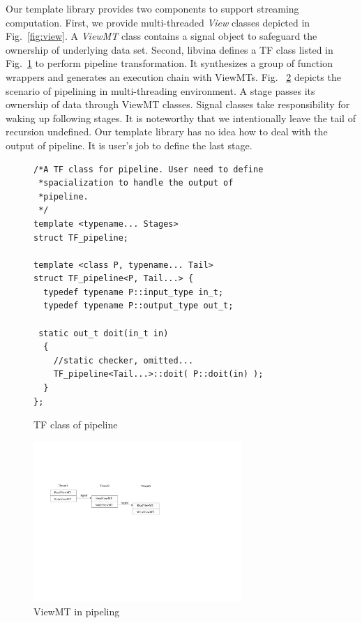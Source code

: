 \documentclass[10pt, conference, compsocconf]{IEEEtran}
\begin{document}
Our template library provides two components to support streaming
computation. First, we provide  multi-threaded \emph{View}
classes depicted in Fig.~\ref{fig:view}. A \emph{ViewMT} class
contains a signal object to safeguard the ownership of underlying data
set. Second, libvina
defines a TF class listed in Fig.~\ref{lst:pipe} to perform
pipeline transformation. It synthesizes a group of function wrappers
and generates an execution chain with ViewMTs.  Fig. ~\ref{fig:viewmt}
depicts the scenario of pipelining in multi-threading environment. A
stage passes its ownership of data through ViewMT classes. Signal
classes take responsibility for waking up following stages.  It is noteworthy
that we intentionally leave the tail of recursion undefined. Our
template library has no idea how to deal with the output of pipeline. It is user's job
to define the last stage.

\begin{figure}[!htp]
\begin{minipage}[tb]{\linewidth}
\makebox[\textwidth]{\hrulefill}
\begin{small}
\begin{verbatim}
/*A TF class for pipeline. User need to define 
 *spacialization to handle the output of 
 *pipeline.
 */
template <typename... Stages>
struct TF_pipeline;

template <class P, typename... Tail>
struct TF_pipeline<P, Tail...> {
  typedef typename P::input_type in_t;
  typedef typename P::output_type out_t;
 
 static out_t doit(in_t in)
  {
    //static checker, omitted...
    TF_pipeline<Tail...>::doit( P::doit(in) );
  }
};  
\end{verbatim}
\end{small}
\vspace{-1ex}\makebox[\textwidth]{\hrulefill}
\end{minipage}
\caption{TF class of pipeline}\label{lst:pipe}
\end{figure}

\begin{figure}[htp]
\includegraphics[width=3.1in]{viewmt}
\caption{ViewMT in pipeling}\label{fig:viewmt}
\end{figure}
\end{document}

